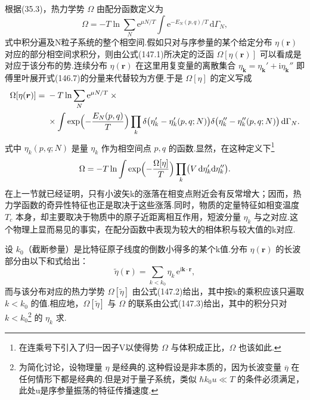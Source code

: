 根据(35.3)，热力学势 $\Omega$ 由配分函数定义为
\begin{equation}
  \Omega=-T\ln\sum_N\mathrm{e}^{\mu N/T}
  \int\mathrm{e}^{-E_N(p,q)/T}\,\mathrm{d}\Gamma_N,
\end{equation}
式中积分遍及N粒子系统的整个相空间.假如只对与序参量的某个给定分布 $\eta(\boldsymbol{r})$ 对应的部分相空间求积分，则由公式(147.1)所决定的泛函 $\Omega[\eta(\boldsymbol{r})]$ 可以看成是对应于该分布的势.连续分布 $\eta(\boldsymbol{r})$ 在这里用复变量的离散集合 $\eta_{\boldsymbol{k}}=\eta_{\boldsymbol{k}}'+\mathrm{i}\eta_{\boldsymbol{k}}''$ 即傅里叶展开式(146.7)的分量来代替较为方便.于是 $\Omega[\eta]$ 的定义写成
\begin{equation}
\begin{aligned}
  \Omega[\eta(\boldsymbol{r})]={}&-T\ln\sum_N\mathrm{e}^{\mu N/T}\times{}\\
  &\times\int\exp\Bigl(-\frac{E_N(p,q)}{T}\Bigr)
  \prod_k\delta\bigl(\eta_k'-\eta_k'(p,q;N)\bigr)
  \delta\bigl(\eta_k''-\eta_k''(p,q;N)\bigr)\,\mathrm{d}\Gamma_N.
\end{aligned}
\end{equation}
式中 $\eta_k(p,q;N)$ 是量 $\eta_k$ 作为相空间点 $p,q$ 的函数.显然，在这种定义下\footnote{在连乘号下引入了归一因子V以使得势 $\Omega$ 与体积成正比，$\Omega$ 也该如此.}
\begin{equation}
  \Omega=-T\ln\int\exp\Bigl(-\frac{\Omega[\eta]}{T}\Bigr)
  \prod_k\bigl(V\,\mathrm{d}\eta_k'\mathrm{d}\eta_k''\bigr).
\end{equation}
在上一节就已经证明，只有小波矢k的涨落在相变点附近会有反常增大；因而，热力学函数的奇异性特征也正是取决于这些涨落.同时，物质的定量特征如相变温度 $T_c$ 本身，却主要取决于物质中的原子近距离相互作用，短波分量 $\eta_k$ 与之对应.这个物理上显而易见的事实，在配分函数中表现为较大的相体积与较大值的k对应.

设 $k_0$（截断参量）是比特征原子线度的倒数小得多的某个k值.分布 $\eta(\boldsymbol{r})$ 的长波部分由以下和式给出：
\begin{equation}
  \widetilde{\eta}(\boldsymbol{r})
  =\sum_{k<k_0}\eta_k\,\mathrm{e}^{\mathrm{i}\boldsymbol{k}\cdot\boldsymbol{r}},
\end{equation}
而与该分布对应的热力学势 $\Omega[\widetilde{\eta}]$ 由公式(147.2)给出，其中按k的乘积应该只遍取 $k<k_0$ 的值.相应地，$\Omega[\widetilde{\eta}]$ 与 $\Omega$ 的联系由公式(147.3)给出，其中的积分只对 $k<k_0$\footnote{为简化讨论，设物理量 $\eta$ 是经典的.这种假设是非本质的，因为长波变量 $\overline{\eta}$ 在任何情形下都是经典的.但是对于量子系统，类似 $\hbar k_0 u\ll T$ 的条件必须满足，此处u是序参量振荡的特征传播速度.} 的 $\eta_k$ 求.

